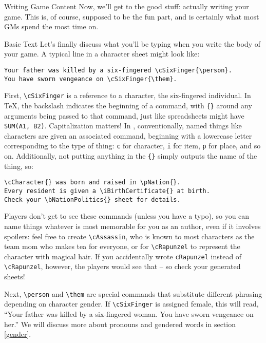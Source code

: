 \documentclass[sheet]{GameTexBase}
\begin{document}
\begin{section}{Writing Game Content}
Now, we'll get to the good stuff: actually writing your game.  This is, of course, supposed to be the fun part, and is certainly what most GMs spend the most time on.

\begin{subsection}{Basic \gametex{} Text}
Let's finally discuss what you'll be typing when you write the body of your game.
A typical line in a \gametex{} character sheet might look like:
\begin{verbatim}
Your father was killed by a six-fingered \cSixFinger{\person}.  
You have sworn vengeance on \cSixFinger{\them}.
\end{verbatim}

First, \lstinline{\cSixFinger} is a reference to a character, the six-fingered individual.  In \TeX{}, the backslash indicates the beginning of a command, with \lstinline|{}| around any arguments being passed to that command, just like spreadsheets might have \texttt{SUM(A1, B2)}.  Capitalization matters!  In \gametex{}, conventionally, named things like characters are given an associated command, beginning with a lowercase letter corresponding to the type of thing: \lstinline{c} for character, \lstinline{i} for item, \lstinline{p} for place, and so on.  Additionally, not putting anything in the \lstinline|{}| simply outputs the name of the thing, so: 
\begin{verbatim}
\cCharacter{} was born and raised in \pNation{}.
Every resident is given a \iBirthCertificate{} at birth.
Check your \bNationPolitics{} sheet for details.
\end{verbatim}

Players don't get to see these commands (unless you have a typo), so you can name things whatever is most memorable for you as an author, even if it involves spoilers: feel free to create \lstinline|\cAssassin|, who is known to most characters as the team mom who makes tea for everyone, or for \lstinline{\cRapunzel} to represent the character with magical hair.  If you accidentally wrote \lstinline{cRapunzel} instead of \lstinline{\cRapunzel}, however, the players would see that -- so check your generated sheets!

Next, \lstinline{\person} and \lstinline{\them} are special \gametex{} commands that substitute different phrasing depending on character gender.  If \lstinline{\cSixFinger} is assigned female, this will read, ``Your father was killed by a six-fingered woman.  You have sworn vengeance on her.''  We will discuss more about pronouns and gendered words in section \ref{gender}.


\end{subsection}
\end{section}
\end{document}
